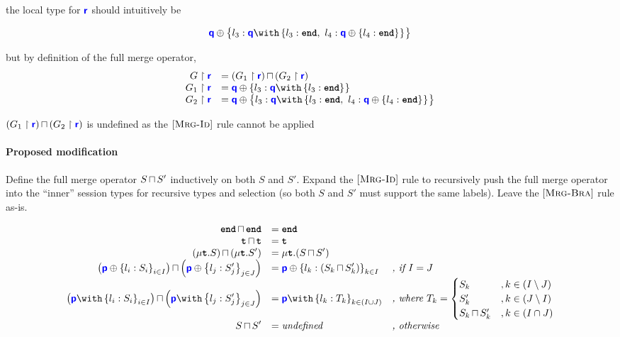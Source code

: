 \documentclass{article}
\begin{document}
the local type for ${\color{blue}\bm{\mathsf{r}}}$ should intuitively be

\[
\tysel{q}{l_3: \tybra{q}{l_3: \tyend,~l_4: \tysel{q}{l_4: \tyend}{}}{}}{}
\]

but by definition of the full merge operator,
\[
\begin{array}{rl}
\proj{G}{r} &= \tymerge{\left(\proj{G_1}{r}\right)}{\left(\proj{G_2}{r}\right)} \\
\proj{G_1}{r} &= \tysel{q}{l_3: \tybra{q}{l_3: \tyend}{}}{} \\
\proj{G_2}{r} &= \tysel{q}{l_3: \tybra{q}{l_3: \tyend,~l_4: \tysel{q}{l_4: \tyend}{}}{}}{}
\end{array}
\]

${\left({G_1} \upharpoonright {\color{blue}\bm{\mathsf{r}}}\right)}\,{\sqcap}\,{\left({G_2} \upharpoonright {\color{blue}\bm{\mathsf{r}}}\right)}$ is undefined as the $[\textsc{Mrg-Id}]$ rule
cannot be applied


\paragraph{Proposed modification} 
Define the full merge operator ${S}\,{\sqcap}\,{S'}$ inductively on
both $S$ and $S'$. Expand the $[\textsc{Mrg-Id}]$ rule
to recursively push the full merge operator into the
``inner'' session types for recursive types and selection
(so both $S$ and $S'$ must support the same labels). 
Leave the $[\textsc{Mrg-Bra}]$ rule as-is.

\doublespacing
\[
\begin{array}{>{\displaystyle}r>{\displaystyle}ll}
		\tymerge{\tyend}{\tyend} & = \tyend &  \\
		\tymerge{\tyrecvar}{\tyrecvar} & = \tyrecvar &  \\
		\tymerge{\left(\tyrec{S}\right)}{\left(\tyrec{S'}\right)} & = \tyrec{\left(\tymerge{S}{S'}\right)} &  \\
		\tymerge{\left(\tysel{p}{l_i: S_i}{i \in I}\right)}{\left(\tysel{p}{l_j: S'_j}{j \in J}\right)} & = \tysel{p}{l_k: \left(\tymerge{S_k}{S'_k}\right)}{k \in I} &  \textit{, if $I = J$} \\
		\tymerge{\left(\tybra{p}{l_i: S_i}{i \in I}\right)}{\left(\tybra{p}{l_j: S'_j}{j \in J}\right)} & = \tybra{p}{l_k: T_k}{k \in (I \cup J)} & \textit{, where } T_k = \begin{cases}
S_k & , k \in \left(I \setminus J\right) \\
S'_k & , k \in \left(J \setminus I\right) \\
\tymerge{S_k}{S'_k} & , k \in \left(I \cap J\right)
\end{cases} \\
		\tymerge{S}{S'} & = \textit{undefined} & \textit{, otherwise}\\
\end{array}
\]
\singlespacing
\end{document}
